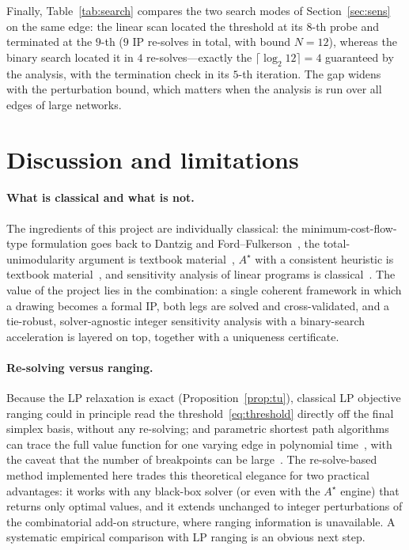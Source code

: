 \documentclass[10pt,twocolumn]{article}
\begin{document}
Finally, Table~\ref{tab:search} compares the two search modes of Section~\ref{sec:sens} on
the same edge: the linear scan located the threshold at its $8$-th probe and terminated at
the $9$-th ($9$ IP re-solves in total, with bound $N=12$), whereas the binary search located
it in $4$ re-solves---exactly the $\lceil\log_2 12\rceil=4$ guaranteed by the analysis, with
the termination check in its $5$-th iteration. The gap widens with the perturbation bound,
which matters when the analysis is run over all edges of large networks.

\section{Discussion and limitations}
\label{sec:discussion}

\paragraph{What is classical and what is not.}
The ingredients of this project are individually classical: the minimum-cost-flow-type
formulation goes back to Dantzig and Ford--Fulkerson~\cite{dantzig60,fordfulkerson62}, the
total-unimodularity argument is textbook material~\cite{ahuja93,schrijver03}, $A^{\star}$ with a
consistent heuristic is textbook material~\cite{hnr68,dechterpearl85}, and sensitivity
analysis of linear programs is classical~\cite{gass85}. The value of the project lies in
the combination: a single coherent framework in which a drawing becomes a formal IP, both
legs are solved and cross-validated, and a tie-robust, solver-agnostic integer sensitivity
analysis with a binary-search acceleration is layered on top, together with a uniqueness
certificate.

\paragraph{Re-solving versus ranging.}
Because the LP relaxation is exact (Proposition~\ref{prop:tu}), classical LP objective
ranging could in principle read the threshold~\eqref{eq:threshold} directly off the final
simplex basis, without any re-solving; and parametric shortest path algorithms can trace
the full value function for one varying edge in polynomial time~\cite{karporlin81,
youngtarjanorlin91}, with the caveat that the number of breakpoints can be
large~\cite{carstensen83}. The re-solve-based method implemented here trades this
theoretical elegance for two practical advantages: it works with any black-box solver (or
even with the $A^{\star}$ engine) that returns only optimal values, and it extends unchanged to
integer perturbations of the combinatorial add-on structure, where ranging information is
unavailable. A systematic empirical comparison with LP ranging is an obvious next step.
\end{document}
